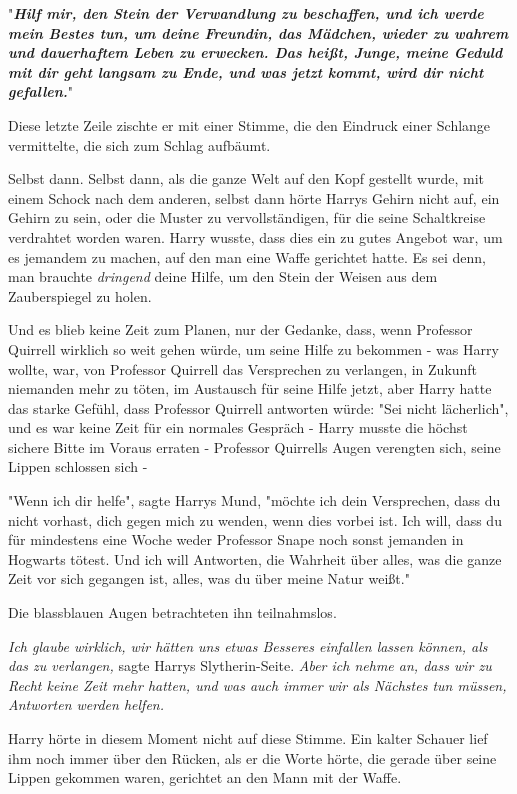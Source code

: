 {"\textbf{\emph{Hilf mir, den Stein der Verwandlung zu beschaffen, und ich werde mein Bestes tun, um deine Freundin, das Mädchen, wieder zu wahrem und dauerhaftem Leben zu erwecken. Das heißt, Junge, meine Geduld mit dir geht langsam zu Ende, und was jetzt kommt, wird dir nicht gefallen.}}"

Diese letzte Zeile zischte er mit einer Stimme, die den Eindruck einer Schlange vermittelte, die sich zum Schlag aufbäumt.

Selbst dann. Selbst dann, als die ganze Welt auf den Kopf gestellt wurde, mit einem Schock nach dem anderen, selbst dann hörte Harrys Gehirn nicht auf, ein Gehirn zu sein, oder die Muster zu vervollständigen, für die seine Schaltkreise verdrahtet worden waren. Harry wusste, dass dies ein zu gutes Angebot war, um es jemandem zu machen, auf den man eine Waffe gerichtet hatte. Es sei denn, man brauchte \emph{dringend} deine Hilfe, um den Stein der Weisen aus dem Zauberspiegel zu holen.

Und es blieb keine Zeit zum Planen, nur der Gedanke, dass, wenn Professor Quirrell wirklich so weit gehen würde, um seine Hilfe zu bekommen - was Harry wollte, war, von Professor Quirrell das Versprechen zu verlangen, in Zukunft niemanden mehr zu töten, im Austausch für seine Hilfe jetzt, aber Harry hatte das starke Gefühl, dass Professor Quirrell antworten würde: "Sei nicht lächerlich", und es war keine Zeit für ein normales Gespräch - Harry musste die höchst sichere Bitte im Voraus erraten - Professor Quirrells Augen verengten sich, seine Lippen schlossen sich -

"Wenn ich dir helfe", sagte Harrys Mund, "möchte ich dein Versprechen, dass du nicht vorhast, dich gegen mich zu wenden, wenn dies vorbei ist. Ich will, dass du für mindestens eine Woche weder Professor Snape noch sonst jemanden in Hogwarts tötest. Und ich will Antworten, die Wahrheit über alles, was die ganze Zeit vor sich gegangen ist, alles, was du über meine Natur weißt."

Die blassblauen Augen betrachteten ihn teilnahmslos.

\emph{Ich glaube wirklich, wir hätten uns etwas Besseres einfallen lassen können, als das zu verlangen,} sagte Harrys Slytherin-Seite. \emph{Aber ich nehme an, dass wir zu Recht keine Zeit mehr hatten, und was auch immer wir als Nächstes tun müssen, Antworten werden helfen.}

Harry hörte in diesem Moment nicht auf diese Stimme. Ein kalter Schauer lief ihm noch immer über den Rücken, als er die Worte hörte, die gerade über seine Lippen gekommen waren, gerichtet an den Mann mit der Waffe.

}
